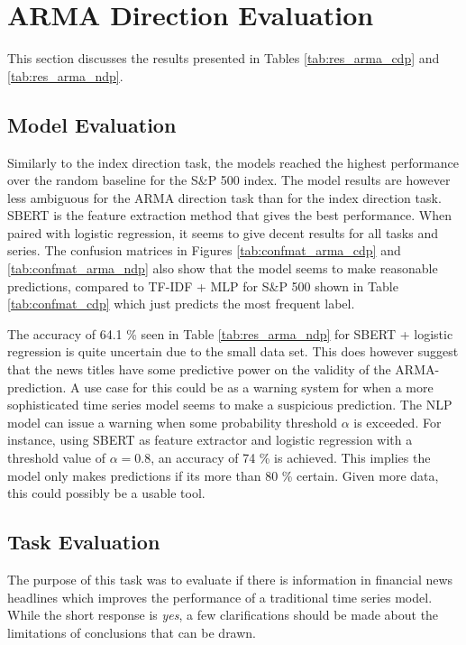 \section{ARMA Direction Evaluation}\label{sec:eval_arma}

This section discusses the results presented in Tables \ref{tab:res_arma_cdp} and \ref{tab:res_arma_ndp}.

\subsection{Model Evaluation}

Similarly to the index direction task, the models reached the highest performance over the random baseline for the S\&P 500 index. The model results are however less ambiguous for the ARMA direction task than for the index direction task. SBERT is the feature extraction method that gives the best performance. When paired with logistic regression, it seems to give decent results for all tasks and series. The confusion matrices in Figures \ref{tab:confmat_arma_cdp} and \ref{tab:confmat_arma_ndp} also show that the model seems to make reasonable predictions, compared to TF-IDF + MLP for S\&P 500 shown in Table \ref{tab:confmat_cdp} which just predicts the most frequent label.

The accuracy of 64.1 \% seen in Table \ref{tab:res_arma_ndp} for SBERT + logistic regression is quite uncertain due to the small data set. This does however suggest that the news titles have some predictive power on the validity of the ARMA-prediction. A use case for this could be as a warning system for when a more sophisticated time series model seems to make a suspicious prediction. The NLP model can issue a warning when some probability threshold $\alpha$ is exceeded. For instance, using SBERT as feature extractor and logistic regression with a threshold value of $\alpha = 0.8$, an accuracy of 74 \% is achieved. This implies the model only makes predictions if its more than 80 \% certain. Given more data, this could possibly be a usable tool. 

\subsection{Task Evaluation}

The purpose of this task was to evaluate if there is information in financial news headlines which improves the performance of a traditional time series model. While the short response is \emph{yes}, a few clarifications should be made about the limitations of conclusions that can be drawn. 

